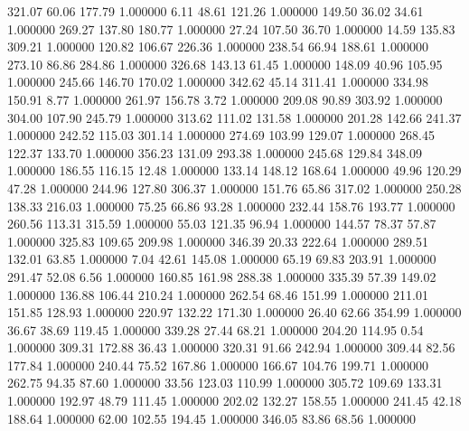     321.07     60.06    177.79  1.000000
      6.11     48.61    121.26  1.000000
    149.50     36.02     34.61  1.000000
    269.27    137.80    180.77  1.000000
     27.24    107.50     36.70  1.000000
     14.59    135.83    309.21  1.000000
    120.82    106.67    226.36  1.000000
    238.54     66.94    188.61  1.000000
    273.10     86.86    284.86  1.000000
    326.68    143.13     61.45  1.000000
    148.09     40.96    105.95  1.000000
    245.66    146.70    170.02  1.000000
    342.62     45.14    311.41  1.000000
    334.98    150.91      8.77  1.000000
    261.97    156.78      3.72  1.000000
    209.08     90.89    303.92  1.000000
    304.00    107.90    245.79  1.000000
    313.62    111.02    131.58  1.000000
    201.28    142.66    241.37  1.000000
    242.52    115.03    301.14  1.000000
    274.69    103.99    129.07  1.000000
    268.45    122.37    133.70  1.000000
    356.23    131.09    293.38  1.000000
    245.68    129.84    348.09  1.000000
    186.55    116.15     12.48  1.000000
    133.14    148.12    168.64  1.000000
     49.96    120.29     47.28  1.000000
    244.96    127.80    306.37  1.000000
    151.76     65.86    317.02  1.000000
    250.28    138.33    216.03  1.000000
     75.25     66.86     93.28  1.000000
    232.44    158.76    193.77  1.000000
    260.56    113.31    315.59  1.000000
     55.03    121.35     96.94  1.000000
    144.57     78.37     57.87  1.000000
    325.83    109.65    209.98  1.000000
    346.39     20.33    222.64  1.000000
    289.51    132.01     63.85  1.000000
      7.04     42.61    145.08  1.000000
     65.19     69.83    203.91  1.000000
    291.47     52.08      6.56  1.000000
    160.85    161.98    288.38  1.000000
    335.39     57.39    149.02  1.000000
    136.88    106.44    210.24  1.000000
    262.54     68.46    151.99  1.000000
    211.01    151.85    128.93  1.000000
    220.97    132.22    171.30  1.000000
     26.40     62.66    354.99  1.000000
     36.67     38.69    119.45  1.000000
    339.28     27.44     68.21  1.000000
    204.20    114.95      0.54  1.000000
    309.31    172.88     36.43  1.000000
    320.31     91.66    242.94  1.000000
    309.44     82.56    177.84  1.000000
    240.44     75.52    167.86  1.000000
    166.67    104.76    199.71  1.000000
    262.75     94.35     87.60  1.000000
     33.56    123.03    110.99  1.000000
    305.72    109.69    133.31  1.000000
    192.97     48.79    111.45  1.000000
    202.02    132.27    158.55  1.000000
    241.45     42.18    188.64  1.000000
     62.00    102.55    194.45  1.000000
    346.05     83.86     68.56  1.000000

